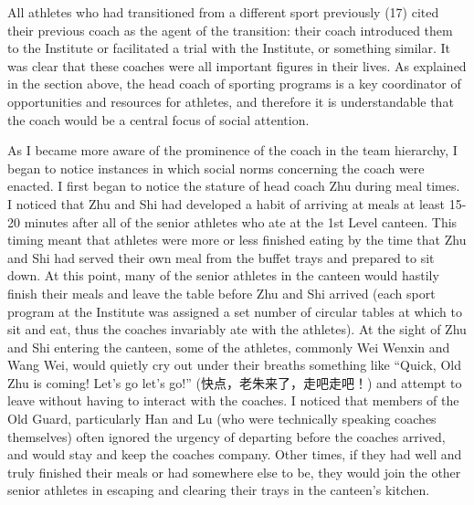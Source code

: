 \begin{CJK}{UTF8}{gbsn}
  All athletes who had transitioned from a different sport previously (17) cited their previous coach as the agent of the transition: their coach introduced them to the Institute or facilitated a trial with the Institute, or something similar.  It was clear that these coaches were all important figures in their lives. As explained in the section above, the head coach of sporting programs is a key coordinator of opportunities and resources for athletes, and therefore it is understandable that the coach would be a central focus of social attention.

  As I became more aware of the prominence of the coach in the team hierarchy, I began to notice instances in which social norms concerning the coach were enacted.  I first began to notice the stature of head coach Zhu during meal times.  I noticed that Zhu and Shi had developed a habit of arriving at meals at least 15-20 minutes after all of the senior athletes who ate at the 1st Level canteen.  This timing meant that athletes were more or less finished eating by the time that Zhu and Shi had served their own meal from the buffet trays and prepared to sit down.  At this point, many of the senior athletes in the canteen would hastily finish their meals and leave the table before Zhu and Shi arrived (each sport program at the Institute was assigned a set number of circular tables at which to sit and eat, thus the coaches invariably ate with the athletes). At the sight of Zhu and Shi entering the canteen, some of the athletes, commonly Wei Wenxin and Wang Wei, would quietly cry out under their breaths something like ``Quick, Old Zhu is coming!  Let's go let's go!'' (快点，老朱来了，走吧走吧！) and attempt to leave without having to interact with the coaches.  I noticed that members of the Old Guard, particularly Han and Lu (who were technically speaking coaches themselves) often ignored the urgency of departing before the coaches arrived, and would stay and keep the coaches company. Other times, if they had well and truly finished their meals or had somewhere else to be, they would join the other senior athletes in escaping and clearing their trays in the canteen's kitchen.


\end{CJK}
